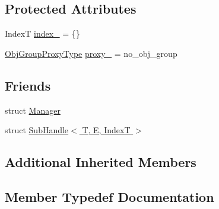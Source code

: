 \subsection*{Protected Attributes}
\begin{DoxyCompactItemize}
\item 
IndexT \hyperlink{structvt_1_1rdma_1_1_handle_3_01_t_00_01_e_00_01_index_t_00_01typename_01std_1_1enable__if__t_3_f66c3940d9f3649c3a5c3e77d63c658a_a22334887cacdf3256127600c50c9d2b1}{index\+\_\+} = \{\}
\item 
\hyperlink{namespacevt_ad7cae989df485fccca57f0792a880a8e}{Obj\+Group\+Proxy\+Type} \hyperlink{structvt_1_1rdma_1_1_handle_3_01_t_00_01_e_00_01_index_t_00_01typename_01std_1_1enable__if__t_3_f66c3940d9f3649c3a5c3e77d63c658a_a050f5dac1123979f6286ca6f99bfbe21}{proxy\+\_\+} = no\+\_\+obj\+\_\+group
\end{DoxyCompactItemize}
\subsection*{Friends}
\begin{DoxyCompactItemize}
\item 
struct \hyperlink{structvt_1_1rdma_1_1_handle_3_01_t_00_01_e_00_01_index_t_00_01typename_01std_1_1enable__if__t_3_f66c3940d9f3649c3a5c3e77d63c658a_a1fd6b9bc3f72bb2b64e602de3982929d}{Manager}
\item 
struct \hyperlink{structvt_1_1rdma_1_1_handle_3_01_t_00_01_e_00_01_index_t_00_01typename_01std_1_1enable__if__t_3_f66c3940d9f3649c3a5c3e77d63c658a_aa597d7381f8793417b0656cbaf1625f0}{Sub\+Handle$<$ T, E, Index\+T $>$}
\end{DoxyCompactItemize}
\subsection*{Additional Inherited Members}


\subsection{Member Typedef Documentation}
\mbox{\label{structvt_1_1rdma_1_1_handle_3_01_t_00_01_e_00_01_index_t_00_01typename_01std_1_1enable__if__t_3_f66c3940d9f3649c3a5c3e77d63c658a_a7b884d1c3b2be49b47899ad24757710a}} 
